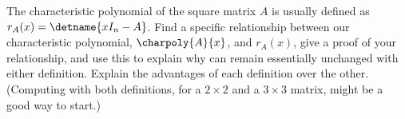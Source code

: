 The characteristic polynomial of the square matrix $A$ is usually defined as $r_A(x)=\detname{xI_n-A}$.  Find a specific relationship between our characteristic polynomial, $\charpoly{A}{x}$, and $r_A(x)$, give a proof of your relationship, and use this to explain why  can remain essentially unchanged with either definition.  Explain the advantages of each definition over the other.  (Computing with both definitions, for a $2\times 2$ and a $3\times 3$ matrix, might be a good way to start.)